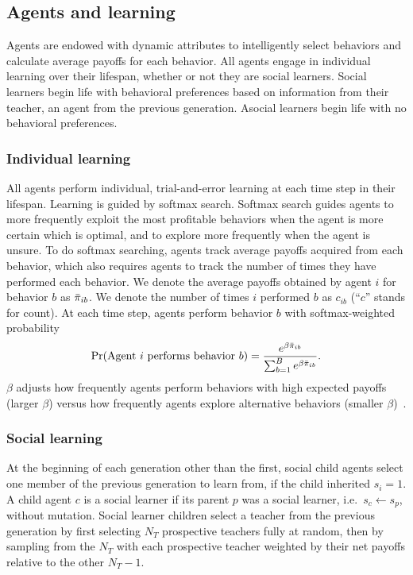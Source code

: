 \documentclass[letterpaper,11.5pt]{scrartcl}
\begin{document}
\subsection{Agents and learning}

Agents are endowed with dynamic attributes to intelligently select behaviors and
calculate average payoffs for each behavior. All agents engage in
individual learning over their lifespan, whether or not they are social learners.
Social learners begin life with
behavioral preferences based on information from their
teacher, an agent from the previous generation. 
Asocial learners begin life with no behavioral
preferences. 


\subsubsection{Individual learning}

All agents perform individual, trial-and-error learning at each time step in
their lifespan.  Learning is guided by softmax search. Softmax search
guides agents to more frequently exploit the most profitable behaviors when the
agent is more certain which is optimal, and to explore more frequently when the
agent is unsure.  To do softmax searching, agents track average payoffs acquired
from each behavior, which also requires agents to track the number of times they
have performed each behavior.  We denote the average payoffs obtained by agent $i$
for behavior $b$ as $\bar\pi_{ib}$. We denote the number of times $i$ performed $b$
as $c_{ib}$ (``$c$'' stands for count). 
At each time step, agents perform behavior $b$ with softmax-weighted probability
\begin{equation}
  \Pr(\text{Agent $i$ performs behavior $b$}) = 
    \frac{e^{\beta \bar\pi_{ib}}}{\sum_{b=1}^B e^{\beta \bar\pi_{ib}}}.
\end{equation}
\noindent
$\beta$ adjusts how frequently agents perform 
behaviors with high expected payoffs (larger $\beta$) versus how frequently
agents explore alternative behaviors (smaller $\beta$)~\cite{McElreath2005}. 


\subsubsection{Social learning}

At the beginning of each generation other than the first, social child agents select
one member of the previous generation to learn from, if the child inherited
$s_i = 1$. A child agent $c$ is a social learner if its parent $p$ was a social
learner, i.e.\ $s_c \leftarrow s_p$, without mutation.  Social learner children
select a teacher from the previous generation by first selecting $N_T$ prospective
teachers fully at random, then by sampling from the $N_T$ with each prospective
teacher weighted by their net payoffs relative to the other $N_T - 1$.
\end{document}
